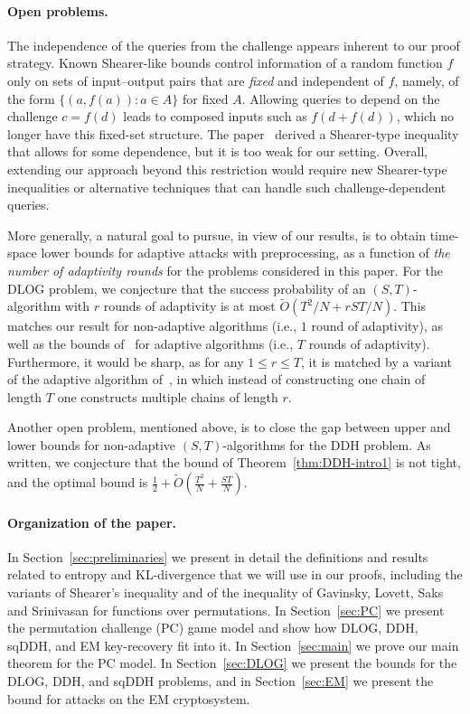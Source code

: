 \documentclass[11pt]{article}
\begin{document}
\paragraph{Open problems.} 
The independence of the queries from the challenge appears inherent to our proof strategy. 
Known Shearer-like bounds control information of a random function $f$ only on sets of input–output pairs that are \emph{fixed} and independent of $f$, namely, of the form $\{(a,f(a)) : a\in A\}$ for fixed $A$. Allowing queries to depend on the challenge $c=f(d)$ leads to composed inputs such as $f(d+f(d))$, which no longer have this fixed-set structure. The paper~\cite{RaoS18} derived a Shearer-type inequality that allows for some dependence, but it is too weak for our setting. 
Overall, extending our approach beyond this restriction would require new Shearer-type inequalities or alternative techniques that can handle such challenge-dependent queries. 

More generally, a natural goal to pursue, in view of our results, is to obtain time-space lower bounds for adaptive attacks with preprocessing, as a function of \emph{the number of adaptivity rounds} for the problems considered in this paper. %
For the DLOG problem, we conjecture that the success probability of an $(S,T)$-algorithm with $r$ rounds of adaptivity is at most $\tilde{O}(T^2/N + rST/N)$. This matches our result for non-adaptive algorithms (i.e., $1$ round of adaptivity), as well as the bounds of~\cite{Corrigan-GibbsK18} for adaptive algorithms (i.e., $T$ rounds of adaptivity). Furthermore, it would be sharp, as for any $1 \leq r \leq T$, it is matched by a variant of the adaptive algorithm of~\cite{BernsteinL13,Corrigan-GibbsK18,Mih10}, in which instead of constructing one chain of length $T$ one constructs multiple chains of length $r$. 

Another open problem, mentioned above, is to close the gap between upper and lower bounds for non-adaptive $(S,T)$-algorithms for the DDH problem. As written, we conjecture that the bound of Theorem~\ref{thm:DDH-intro1} is not tight, and the optimal bound is  
 $\frac{1}{2} + \tilde{O}(\frac{T^2}{N}+\frac{ST}{N})$.


\paragraph{Organization of the paper.} In Section~\ref{sec:preliminaries} we present in detail the definitions and results related to entropy and KL-divergence that we will use in our proofs, including the variants of Shearer's inequality and of the inequality of Gavinsky, Lovett, Saks and Srinivasan for functions over permutations. In Section~\ref{sec:PC} we present the permutation challenge (PC) game model and show how  DLOG, DDH, sqDDH, and EM key-recovery fit into it. In Section~\ref{sec:main} we prove our main theorem for the PC model.
In Section~\ref{sec:DLOG} we present the bounds for the DLOG, DDH, and sqDDH problems, and in Section~\ref{sec:EM} we present the bound for attacks on the EM cryptosystem. 
\end{document}

